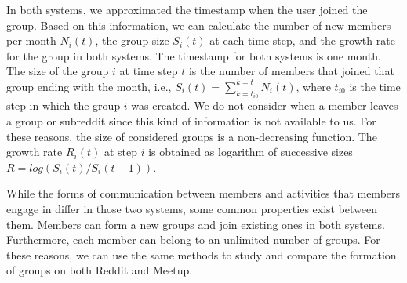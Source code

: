 In both systems, we approximated the timestamp when the user joined the group. Based on this information, we can calculate the number of new members per month $N_{i}(t)$, the group size $S_{i}(t)$ at each time step, and the growth rate for the group in both systems. The timestamp for both systems is one month. The size of the group $i$ at time step $t$ is the number of members that joined that group ending with the month, i.e., $S_{i}(t)=\sum^{k=t}_{k=t_{i0}}N_{i}(t)$, where $t_{i0}$ is the time step in which the group $i$ was created. We do not consider when a member leaves a group or subreddit since this kind of information is not available to us. For these reasons, the size of considered groups is a non-decreasing function. The growth rate $R_i(t)$ at step $i$ is obtained as logarithm of successive sizes $R = log(S_{i}(t)/S_{i}(t-1))$. 

While the forms of communication between members and activities that members engage in differ in those two systems, some common properties exist between them. Members can form a new groups and join existing ones in both systems. Furthermore, each member can belong to an unlimited number of groups. For these reasons, we can use the same methods to study and compare the formation of groups on both Reddit and Meetup. 




